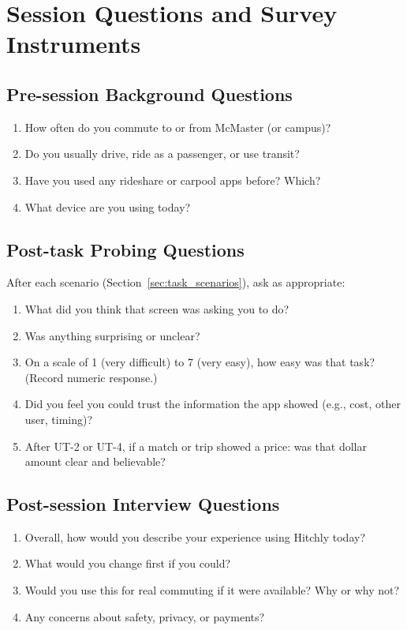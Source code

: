 \section{Session Questions and Survey Instruments}
\label{sec:questions_surveys}

\subsection{Pre-session Background Questions}

\begin{enumerate}[label=\textbf{Q\arabic*:}]
  \item How often do you commute to or from McMaster (or campus)?
  \item Do you usually drive, ride as a passenger, or use transit?
  \item Have you used any rideshare or carpool apps before? Which?
  \item What device are you using today?
\end{enumerate}

\subsection{Post-task Probing Questions}

After each scenario (Section~\ref{sec:task_scenarios}), ask as appropriate:

\begin{enumerate}[label=\textbf{PT\arabic*:}]
  \item What did you think that screen was asking you to do?
  \item Was anything surprising or unclear?
  \item On a scale of 1 (very difficult) to 7 (very easy), how easy was that task? (Record numeric response.)
  \item Did you feel you could trust the information the app showed (e.g., cost, other user, timing)?
  \item After UT-2 or UT-4, if a match or trip showed a price: was that dollar amount clear and believable?
\end{enumerate}

\subsection{Post-session Interview Questions}

\begin{enumerate}[label=\textbf{PS\arabic*:}]
  \item Overall, how would you describe your experience using Hitchly today?
  \item What would you change first if you could?
  \item Would you use this for real commuting if it were available? Why or why not?
  \item Any concerns about safety, privacy, or payments?
\end{enumerate}


